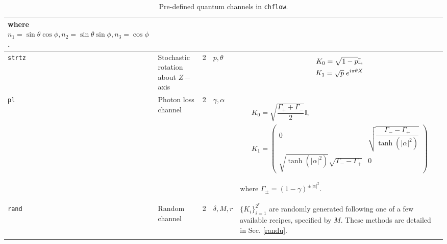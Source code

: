 \documentclass[11pt]{article}
\def\bI{\mathbb{I}}
\begin{document}
\begin{longtable}{|p{1.2cm}|p{2.5cm}|p{1cm}|p{2cm}|p{8cm}|}
where $n_{1} = \sin\theta\cos\phi, n_{2} = \sin\theta\sin\phi, n_{3} = \cos\phi$. \\
\hline
\texttt{strtz} & Stochastic rotation about $Z-$axis & 2 & $p, \theta$ &
\parbox{5cm}{\begin{gather*}
K_{0} = \sqrt{1 - p}\bI, \\
K_{1} = \sqrt{p}\thickspace e^{i \pi \theta X}
\end{gather*}} \\
\hline
\texttt{pl} & Photon loss channel & 2 & $\gamma, \alpha$ &
\parbox{5cm}{\begin{gather*}
K_{0} = \sqrt{\dfrac{\Gamma_{+} + \Gamma_{-}}{2}}\bI, \\
K_{1} = \begin{pmatrix}0 & \sqrt{\dfrac{\Gamma_{-} - \Gamma_{+}}{\tanh(|\alpha|^{2})}} \\ \sqrt{\tanh(|\alpha|^{2})}\sqrt{\Gamma_{-} - \Gamma_{+}} & 0\end{pmatrix}
\end{gather*}

where $\Gamma_{\pm} = (1 - \gamma)^{\pm|\alpha|^{2}}$.

\vspace{0.1cm}

} \\
\hline
\texttt{rand} & Random channel & 2 & $\delta, M, r$ & $\{K_{i}\}_{i = 1}^{2^{r}}$ are randomly generated following one of a few available recipes, specified by $M$. These methods are detailed in Sec. \ref{randu}. \\
\hline
\caption{Pre-defined quantum channels in \texttt{chflow}.}
\label{predefchans}
\end{longtable}
\end{document}
